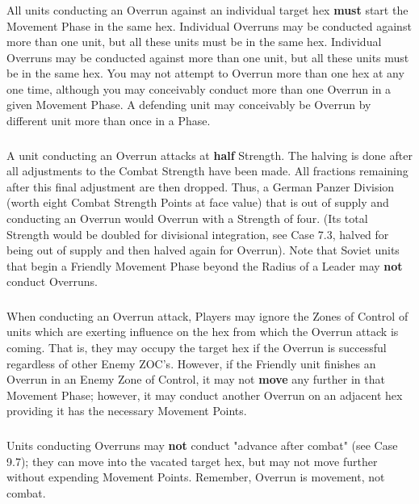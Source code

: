 \subsubsection{} All units conducting an Overrun against an individual target hex \textbf{must} start the Movement Phase in the same hex. Individual Overruns may be conducted against more than one unit, but all these units must be in the same hex. Individual Overruns may be conducted against more than one unit, but all these units must be in the same hex. You may not attempt to Overrun more than one hex at any one time, although you may conceivably conduct more than one Overrun in a given Movement Phase. A defending unit may conceivably be Overrun by different unit more than once in a Phase.

\subsubsection{} A unit conducting an Overrun attacks at \textbf{half} Strength. The halving is done after all adjustments to the Combat Strength have been made. All fractions remaining after this final adjustment are then dropped. Thus, a German Panzer Division (worth eight Combat Strength Points at face value) that is out of supply and conducting an Overrun would Overrun with a Strength of four. (Its total Strength would be doubled for divisional integration, see Case 7.3, halved for being out of supply and then halved again for Overrun). Note that Soviet units that begin a Friendly Movement Phase beyond the Radius of a Leader may \textbf{not} conduct Overruns.

\subsubsection{} When conducting an Overrun attack, Players may ignore the Zones of Control of units which are exerting influence on the hex from which the Overrun attack is coming. That is, they may occupy the target hex if the Overrun is successful regardless of other Enemy ZOC's. However, if the Friendly unit finishes an Overrun in an Enemy Zone of Control, it may not \textbf{move} any further in that Movement Phase; however, it may conduct another Overrun on an adjacent hex providing it has the necessary Movement Points.

\subsubsection{} Units conducting Overruns may \textbf{not} conduct "advance after combat" (see Case 9.7); they can move into the vacated target hex, but may not move further without expending Movement Points. Remember, Overrun is movement, not combat.

